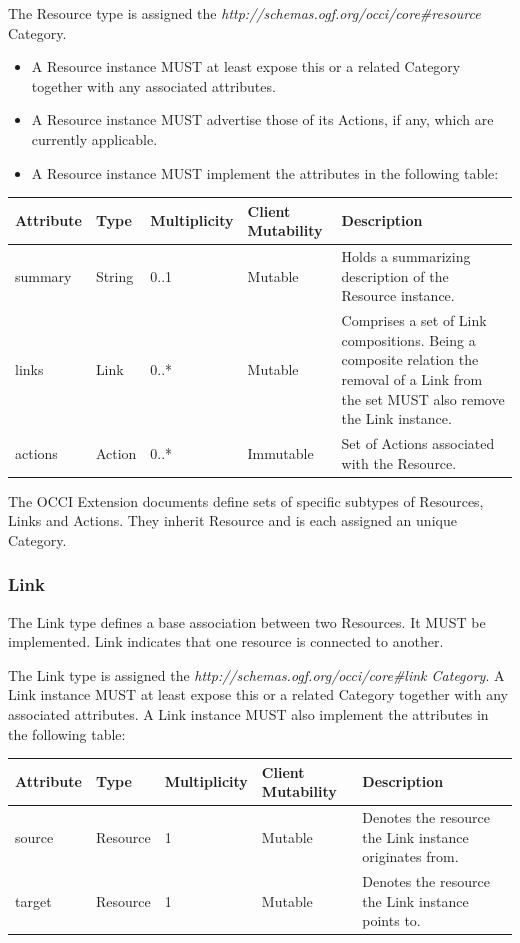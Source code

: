 \documentclass[10pt,a4paper,british]{article}
\begin{document}
The Resource type is assigned the
\textit{http://schemas.ogf.org/occi/core\#resource} Category.

\begin{itemize}
  \item A Resource instance MUST at least expose this or a related
    Category together with any associated attributes.
  \item A Resource instance MUST advertise those of its Actions, if
    any, which are currently applicable.
  \item A Resource instance MUST implement the attributes in the
    following table:
\end{itemize}

\begin{tabular}{l|l|l|l|p{2.7in}}
Attribute & Type & Multiplicity & Client Mutability & Description \\
\hline
summary & String & 0..1 & Mutable & Holds a summarizing description of the Resource instance.\\
links & Link & 0..* & Mutable & Comprises a set of Link compositions. Being a composite relation the removal of a Link from the set MUST also remove the Link instance.\\
actions & Action & 0..* & Immutable & Set of Actions associated with the Resource.\\
\end{tabular}

The OCCI Extension documents define sets of specific subtypes of
Resources, Links and Actions. They inherit Resource and is each
assigned an unique Category.

\subsubsection{Link}
The Link type defines a base association between two Resources. It
MUST be implemented. Link indicates that one resource is connected to
another.

The Link type is assigned the
\textit{http://schemas.ogf.org/occi/core\#link Category}. A Link
instance MUST at least expose this or a related Category together with
any associated attributes. A Link instance MUST also implement the
attributes in the following table:

\begin{tabular}{l|l|l|l|p{2.7in}}
Attribute & Type & Multiplicity & Client Mutability & Description \\
\hline
source & Resource & 1 & Mutable & Denotes the resource the Link instance originates from.\\
target & Resource & 1 & Mutable & Denotes the resource the Link instance points to.\\
\end{tabular}
\end{document}
